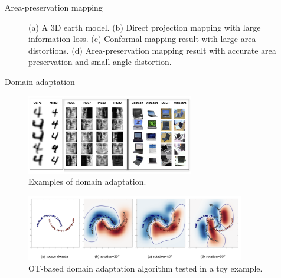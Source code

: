 \begin{frame}{Area-preservation mapping}
\begin{figure}
\begin{minipage}[c]{0.45\linewidth}
            \caption{
            (a) A 3D earth model. (b) Direct projection mapping with large information loss. 
            (c) Conformal mapping result with large area distortions. 
            (d) Area-preservation mapping result with accurate area preservation and 
            small angle distortion.}
        \end{minipage}
    \end{figure}
\end{frame}

\begin{frame}{Domain adaptation}
    \footnotesize
    \vspace{-.8em}
    \begin{figure}
        \centering
        \captionsetup{font=scriptsize}
        \centering
        \includegraphics[width=0.65\textwidth]{png/domain-adapt-fig4.png}
        \vspace{-.8em}
        \caption{Examples of domain adaptation.}
    \end{figure}

    \vspace{-1.2em}
    \begin{figure}
        \centering
        \captionsetup{font=scriptsize}
        \centering
        \includegraphics[width=0.85\textwidth]{png/domain-adapt-fig3.png}
        \vspace{-.8em}
        \caption{OT-based domain adaptation algorithm tested in a toy example.}
    \end{figure}
\end{frame}